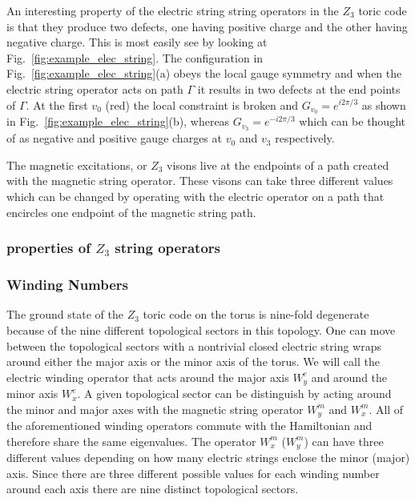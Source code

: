 \documentclass[aps,floatfix,11pt,twocolumn]{revtex4-1}
\begin{document}
            An interesting property of the electric string string operators in the $Z_3$ toric code is
            that they produce two defects, one having positive charge and the other having negative
            charge. This is most easily see by looking at Fig.~\ref{fig:example_elec_string}. The
            configuration in Fig.~\ref{fig:example_elec_string}(a) obeys the local gauge symmetry and
            when the electric string operator acts on path $\Gamma$ it results in two defects at the
            end points of $\Gamma$. At the first $v_0$ (red) the local constraint is broken and
            $G_{v_0} = e^{i2\pi /3}$ as shown in Fig.~\ref{fig:example_elec_string}(b), whereas
            $G_{v_3} = e^{-i2\pi /3}$ which can be thought of as negative and positive gauge charges
            at $v_0$ and $v_3$ respectively.

            The magnetic excitations, or $Z_3$ visons live at the endpoints of a path created with the magnetic
            string operator. These visons can take three different values which can be changed by
            operating with the electric operator on a path that encircles one endpoint of the
            magnetic string path. 


        \subsubsection{properties of $Z_3$ string operators}

        \subsubsection{Winding Numbers}

            The ground state of the $Z_3$ toric code on the torus is nine-fold degenerate because of
            the nine different topological sectors in this topology. One can move between the
            topological sectors with a nontrivial closed electric string wraps around either
            the major axis or the minor axis of the torus. We will call the electric winding
            operator that acts around the major axis $W^e_y$ and around the minor axis $W^e_x$.
            A given topological sector can be distinguish 
            by acting around the minor and major axes with the magnetic string operator $W^m_y$ and
            $W^m_x$. All of the aforementioned winding operators commute with the Hamiltonian and
            therefore share the same eigenvalues. The operator $W^m_{x}$ ($W^m_{y}$) can 
            have three different values depending on how many electric strings enclose the minor
            (major) axis. Since there are three different
            possible values for each winding number around each axis there are nine distinct
            topological sectors.
\end{document}
